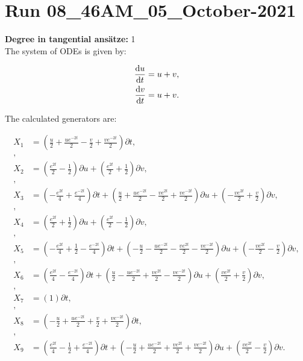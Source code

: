 \section*{Run 08\_46AM\_05\_October-2021}
\textbf{Degree in tangential ansätze:}	1\\
The system of ODEs is given by:

\begin{align*}
\dv{u}{t}&=u + v,\\
\dv{v}{t}&=u + v.\\
\end{align*}

\noindent The calculated generators are:

\begin{align*}
X_{1}&=\left( \frac{u}{2} + \frac{u e^{- 2 t}}{2} - \frac{v}{2} + \frac{v e^{- 2 t}}{2} \right)\partial t,\\
,\\
X_{2}&=\left( \frac{e^{2 t}}{2} - \frac{1}{2} \right)\partial u+\left( \frac{e^{2 t}}{2} + \frac{1}{2} \right)\partial v,\\
,\\
X_{3}&=\left( - \frac{e^{2 t}}{4} + \frac{e^{- 2 t}}{4} \right)\partial t+\left( \frac{u}{2} + \frac{u e^{- 2 t}}{2} - \frac{v e^{2 t}}{2} + \frac{v e^{- 2 t}}{2} \right)\partial u+\left( - \frac{v e^{2 t}}{2} + \frac{v}{2} \right)\partial v,\\
,\\
X_{4}&=\left( \frac{e^{2 t}}{2} + \frac{1}{2} \right)\partial u+\left( \frac{e^{2 t}}{2} - \frac{1}{2} \right)\partial v,\\
,\\
X_{5}&=\left( - \frac{e^{2 t}}{4} + \frac{1}{2} - \frac{e^{- 2 t}}{4} \right)\partial t+\left( - \frac{u}{2} - \frac{u e^{- 2 t}}{2} - \frac{v e^{2 t}}{2} - \frac{v e^{- 2 t}}{2} \right)\partial u+\left( - \frac{v e^{2 t}}{2} - \frac{v}{2} \right)\partial v,\\
,\\
X_{6}&=\left( \frac{e^{2 t}}{4} - \frac{e^{- 2 t}}{4} \right)\partial t+\left( \frac{u}{2} - \frac{u e^{- 2 t}}{2} + \frac{v e^{2 t}}{2} - \frac{v e^{- 2 t}}{2} \right)\partial u+\left( \frac{v e^{2 t}}{2} + \frac{v}{2} \right)\partial v,\\
,\\
X_{7}&=\left( 1 \right)\partial t,\\
,\\
X_{8}&=\left( - \frac{u}{2} + \frac{u e^{- 2 t}}{2} + \frac{v}{2} + \frac{v e^{- 2 t}}{2} \right)\partial t,\\
,\\
X_{9}&=\left( \frac{e^{2 t}}{4} - \frac{1}{2} + \frac{e^{- 2 t}}{4} \right)\partial t+\left( - \frac{u}{2} + \frac{u e^{- 2 t}}{2} + \frac{v e^{2 t}}{2} + \frac{v e^{- 2 t}}{2} \right)\partial u+\left( \frac{v e^{2 t}}{2} - \frac{v}{2} \right)\partial v.\\
\end{align*}
